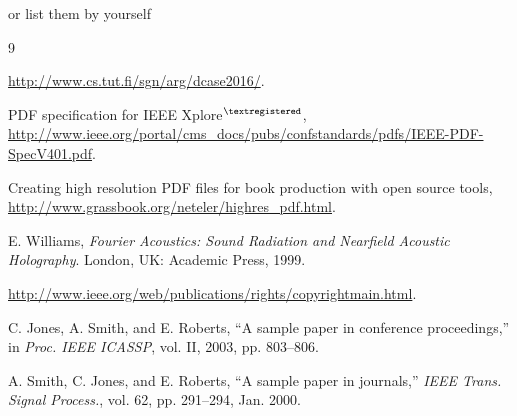 \documentclass{article}
\begin{document}
\begin{sloppy}
or list them by yourself
\begin{thebibliography}{9}

  \url{http://www.cs.tut.fi/sgn/arg/dcase2016/}.

  {PDF} specification for {IEEE} {X}plore$^{\textregistered}$,
  \url{http://www.ieee.org/portal/cms_docs/pubs/confstandards/pdfs/IEEE-PDF-SpecV401.pdf}.

  Creating high resolution {PDF} files for book production with 
  open source tools, 
  \url{http://www.grassbook.org/neteler/highres_pdf.html}.

E. Williams, \emph{Fourier Acoustics: Sound Radiation and Nearfield Acoustic
  Holography}. London, UK: Academic Press, 1999.

  \url{http://www.ieee.org/web/publications/rights/copyrightmain.html}.

C. Jones, A. Smith, and E. Roberts, ``A sample paper in conference
  proceedings,'' in \emph{Proc. IEEE ICASSP}, vol. II, 2003, pp. 803--806.

A. Smith, C. Jones, and E. Roberts, ``A sample paper in journals,'' 
  \emph{IEEE Trans. Signal Process.}, vol. 62, pp. 291--294, Jan. 2000.

\end{thebibliography}


\end{sloppy}
\end{document}
